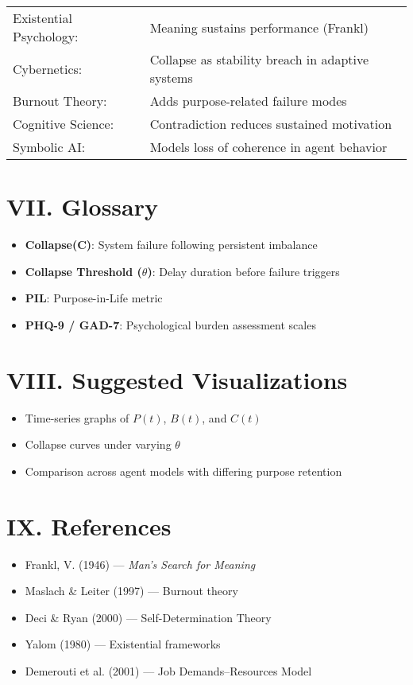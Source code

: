 \documentclass[12pt]{article}
\begin{document}
\begin{tabular}{ll}
Existential Psychology: & Meaning sustains performance (Frankl) \\
Cybernetics: & Collapse as stability breach in adaptive systems \\
Burnout Theory: & Adds purpose-related failure modes \\
Cognitive Science: & Contradiction reduces sustained motivation \\
Symbolic AI: & Models loss of coherence in agent behavior \\
\end{tabular}

\section*{VII. Glossary}

\begin{itemize}
  \item \textbf{Collapse(C)}: System failure following persistent imbalance
  \item \textbf{Collapse Threshold (\( \theta \))}: Delay duration before failure triggers
  \item \textbf{PIL}: Purpose-in-Life metric
  \item \textbf{PHQ-9 / GAD-7}: Psychological burden assessment scales
\end{itemize}

\section*{VIII. Suggested Visualizations}

\begin{itemize}
  \item Time-series graphs of \( P(t) \), \( B(t) \), and \( C(t) \)
  \item Collapse curves under varying \( \theta \)
  \item Comparison across agent models with differing purpose retention
\end{itemize}

\section*{IX. References}

\begin{itemize}
  \item Frankl, V. (1946) — \textit{Man’s Search for Meaning}
  \item Maslach \& Leiter (1997) — Burnout theory
  \item Deci \& Ryan (2000) — Self-Determination Theory
  \item Yalom (1980) — Existential frameworks
  \item Demerouti et al. (2001) — Job Demands–Resources Model
\end{itemize}
\end{document}
